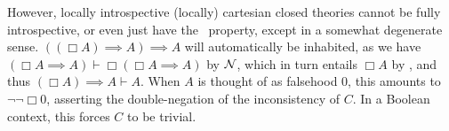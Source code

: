 \begin{observation}
However, locally introspective (locally) cartesian closed theories cannot be fully introspective, or even just have the \Loeb\ property, except in a somewhat degenerate sense. $((\Box A) \implies A) \implies A$ will automatically be inhabited, as we have $(\Box A \implies A) \vdash \Box (\Box A \implies A)$ by $\mathcal{N}$, which in turn entails $\Box A$ by \Loeb, and thus $(\Box A) \implies A \vdash A$. When $A$ is thought of as falsehood $0$, this amounts to $\neg \neg \Box 0$, asserting the double-negation of the inconsistency of $C$. In a Boolean context, this forces $C$ to be trivial.

\end{observation}